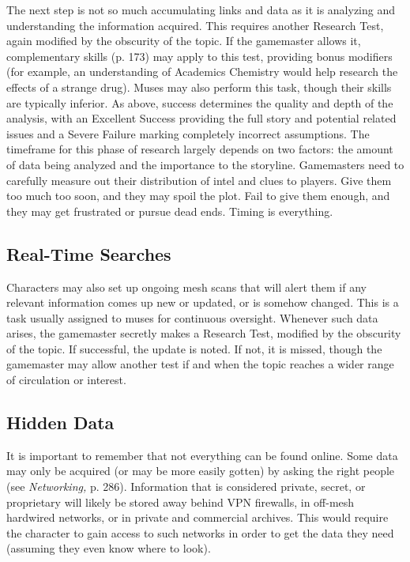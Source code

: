 The next step is not so much accumulating links 
and data as it is analyzing and understanding the 
information acquired. This requires another Research
Test, again modified by the obscurity of the
topic. If the gamemaster allows it, complementary 
skills (p. 173) may apply to this test, providing bonus 
modifiers (for example, an understanding of Academics
Chemistry would help research the effects of a
strange drug). Muses may also perform this task, 
though their skills are typically inferior. As above, 
success determines the quality and depth of the 
analysis, with an Excellent Success providing the full 
story and potential related issues and a Severe Failure
marking completely incorrect assumptions. The
timeframe for this phase of research largely depends 
on two factors: the amount of data being analyzed 
and the importance to the storyline. Gamemasters 
need to carefully measure out their distribution of 
intel and clues to players. Give them too much too 
soon, and they may spoil the plot. Fail to give them 
enough, and they may get frustrated or pursue dead 
ends. Timing is everything.

\subsection{Real-Time Searches}

Characters may also set up ongoing mesh scans that will 
alert them if any relevant information comes up new or 
updated, or is somehow changed. This is a task usually 
assigned to muses for continuous oversight. Whenever 
such data arises, the gamemaster secretly makes a Research
Test, modified by the obscurity of the topic. If
successful, the update is noted. If not, it is missed, though 
the gamemaster may allow another test if and when the 
topic reaches a wider range of circulation or interest.

\subsection{Hidden Data}

It is important to remember that not everything can 
be found online. Some data may only be acquired (or 
may be more easily gotten) by asking the right people 
(see \textit{Networking,} p. 286). Information that is considered
private, secret, or proprietary will likely be stored
away behind VPN firewalls, in off-mesh hardwired 
networks, or in private and commercial archives. This 
would require the character to gain access to such 
networks in order to get the data they need (assuming 
they even know where to look).

